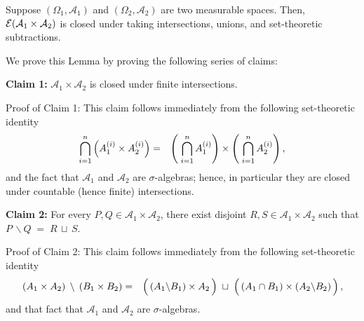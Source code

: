 \begin{lemma}
\label{EAoneAtwo}
\mbox{}\vskip0.1cm\noindent
Suppose
$\left(\Omega_{1},\mathcal{A}_{1}\right)$ and $\left(\Omega_{2},\mathcal{A}_{2}\right)$
are two measurable spaces.
\vskip 0.1cm
\noindent
Then, $\mathcal{E}\!\left(\mathcal{A}_{1}\times\mathcal{A}_{2}\right)$
is closed under taking intersections, unions, and set-theoretic subtractions.
\end{lemma}
\proof
We prove this Lemma by proving the following series of claims:
\begin{center}
\begin{minipage}{6.5in}
\textbf{Claim 1:}\quad
$\mathcal{A}_{1} \times \mathcal{A}_{2}$ is closed under finite intersections.
\end{minipage}
\end{center}
Proof of Claim 1:\quad
This claim follows immediately from the following set-theoretic identity
\begin{eqnarray*}
\overset{n}{\underset{i=1}{\bigcap}} \left(A_{1}^{(i)} \times A_{2}^{(i)}\right)
& = &
	\left(\;\overset{n}{\underset{i=1}{\bigcap}}\,A_{1}^{(i)} \right)
	\overset{{\color{white}.}}{\times}
	\left(\;\overset{n}{\underset{i=1}{\bigcap}}\,A_{2}^{(i)} \right),
\end{eqnarray*}
and the fact that $\mathcal{A}_{1}$ and $\mathcal{A}_{2}$ are $\sigma$-algebras;
hence, in particular they are closed under countable (hence finite) intersections.

\vskip 0.5cm
\begin{center}
\begin{minipage}{6.5in}
\textbf{Claim 2:}\quad
For every $P, Q \in \mathcal{A}_{1}\times\mathcal{A}_{2}$,
there exist disjoint $R, S \in \mathcal{A}_{1}\times\mathcal{A}_{2}$ such that
$P\,\backslash Q \; = \; R \,\sqcup\, S$.
\end{minipage}
\end{center}
Proof of Claim 2:\quad
This claim follows immediately from the following set-theoretic identity
\begin{eqnarray*}
\left.\left(A_{1} \times A_{2}\right)\;\,\right\backslash\;\left(B_{1}\times B_{2}\right)
& = &
	\left(\,\left(A_{1} \backslash B_{1}\right) \overset{{\color{white}.}}{\times} A_{2}\,\right)
	\;\sqcup\;
	\left(\,\left(A_{1}\cap B_{1}\right) \overset{{\color{white}.}}{\times} \left(A_{2}\backslash B_{2}\right)\,\right),
\end{eqnarray*}
and that fact that $\mathcal{A}_{1}$ and $\mathcal{A}_{2}$ are $\sigma$-algebras.

